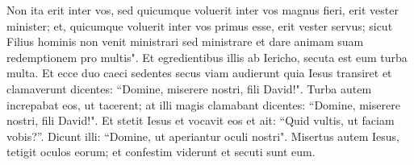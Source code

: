 \begin{biblechapter}
\verse Non ita erit inter vos, sed quicumque voluerit inter vos magnus fieri, erit vester minister; 
\verse et, quicumque voluerit inter vos primus esse, erit vester servus; 
\verse sicut Filius hominis non venit ministrari sed ministrare et dare animam suam redemptionem pro multis". 
\verse Et egredientibus illis ab Iericho, secuta est eum turba multa. 
\verse Et ecce duo caeci sedentes secus viam audierunt quia Iesus transiret et clamaverunt dicentes: “Domine, miserere nostri, fili David!". 
\verse Turba autem increpabat eos, ut tacerent; at illi magis clamabant dicentes: “Domine, miserere nostri, fili David!". 
\verse Et stetit Iesus et vocavit eos et ait: “Quid vultis, ut faciam vobis?”. 
\verse Dicunt illi: “Domine, ut aperiantur oculi nostri". 
\verse Misertus autem Iesus, tetigit oculos eorum; et confestim viderunt et secuti sunt eum. 
\end{biblechapter}


